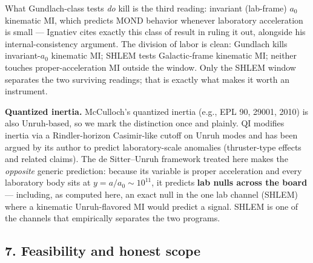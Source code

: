 \documentclass[
]{article}
\begin{document}
What Gundlach-class tests \emph{do} kill is the third reading: invariant
(lab-frame) \(a_0\) kinematic MI, which predicts MOND behavior whenever
laboratory acceleration is small --- Ignatiev cites exactly this class
of result in ruling it out, alongside his internal-consistency argument.
The division of labor is clean: Gundlach kills invariant-\(a_0\)
kinematic MI; SHLEM tests Galactic-frame kinematic MI; neither touches
proper-acceleration MI outside the window. Only the SHLEM window
separates the two surviving readings; that is exactly what makes it
worth an instrument.

\textbf{Quantized inertia.} McCulloch's quantized inertia (e.g., EPL 90,
29001, 2010) is also Unruh-based, so we mark the distinction once and
plainly. QI modifies inertia via a Rindler-horizon Casimir-like cutoff
on Unruh modes and has been argued by its author to predict
laboratory-scale anomalies (thruster-type effects and related claims).
The de Sitter--Unruh framework treated here makes the \emph{opposite}
generic prediction: because its variable is proper acceleration and
every laboratory body sits at \(y = a/a_0 \sim 10^{11}\), it predicts
\textbf{lab nulls across the board} --- including, as computed here, an
exact null in the one lab channel (SHLEM) where a kinematic
Unruh-flavored MI would predict a signal. SHLEM is one of the channels
that empirically separates the two programs.

\subsection{7. Feasibility and honest
scope}\label{feasibility-and-honest-scope}
\end{document}
